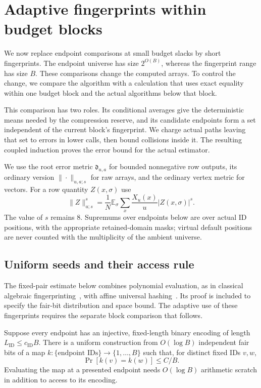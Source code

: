 \section{Adaptive fingerprints within budget blocks}
\label{sec:fp-blocks}

We now replace endpoint comparisons at small budget slacks by short fingerprints.
The endpoint universe has size $2^{O(B)}$, whereas the fingerprint range has size
$B$.  These comparisons change the computed arrays.  To control the change,
we compare the algorithm with a calculation that uses exact equality
within one budget block and the actual algorithms below that block.

This comparison has two roles.  Its conditional averages give the
deterministic means needed by the compression reserve, and its candidate
endpoints form a set independent of the current block's fingerprint.  We charge
actual paths leaving that set to errors in lower calls, then bound
collisions inside it.  The resulting coupled induction proves the error
bound for the actual estimator.

We use the root error metric $\mathfrak d_{u,a}$ for bounded nonnegative row
outputs, its ordinary version $\|\cdot\|_{u,a;s}$ for raw arrays, and the
ordinary vertex metric for vectors.  For a row quantity $Z(x,\sigma)$ use
\begin{equation}
 \|Z\|_{u;s}^s
 =\frac1N\mathbb E_\sigma\sum_x\frac{X_u(x)}u|Z(x,\sigma)|^s.
 \label{eq:fp-row-measure}
\end{equation}
The value of $s$ remains $8$.  Supremums over endpoints below are over actual
ID positions, with the appropriate retained-domain masks; virtual default
positions are never counted with the multiplicity of the ambient universe.

\subsection{Uniform seeds and their access rule}

The fixed-pair estimate below combines polynomial evaluation, as in
classical algebraic fingerprinting~\cite{Schwartz1980}, with affine
universal hashing~\cite{CarterWegman1979}. Its proof is included to
specify the fair-bit distribution and space bound. The adaptive use of
these fingerprints requires the separate block comparison that follows.

\begin{lemma}\label{lem:fp-hash}
Suppose every endpoint has an injective, fixed-length binary encoding of
length $L_{\mathrm{ID}}\le c_{\mathrm{ID}}B$.  There is a uniform construction from
$O(\log B)$ independent fair bits of a map
$k:\{\text{endpoint IDs}\}\longrightarrow\{1,\ldots,B\}$ such that, for
distinct fixed IDs $v,w$,
\begin{equation}
 \Pr[k(v)=k(w)]\le C/B.
 \label{eq:fp-pair-collision}
\end{equation}
Evaluating the map at a presented endpoint needs $O(\log B)$ arithmetic
scratch in addition to access to its encoding.
\end{lemma}

